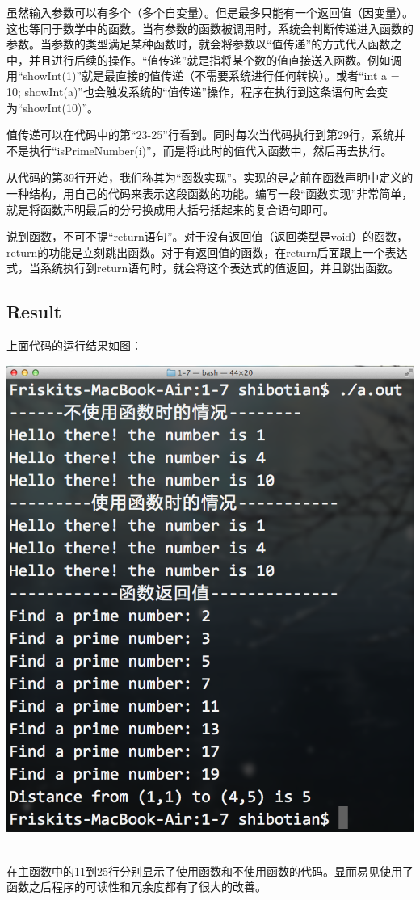 虽然输入参数可以有多个（多个自变量）。但是最多只能有一个返回值（因变量）。这也等同于数学中的函数。当有参数的函数被调用时，系统会判断传递进入函数的参数。当参数的类型满足某种函数时，就会将参数以“值传递”的方式代入函数之中，并且进行后续的操作。“值传递”就是指将某个数的值直接送入函数。例如调用“showInt(1)”就是最直接的值传递（不需要系统进行任何转换）。或者“int a = 10; showInt(a)”也会触发系统的“值传递”操作，程序在执行到这条语句时会变为“showInt(10)”。

值传递可以在代码中的第“23-25”行看到。同时每次当代码执行到第29行，系统并不是执行“isPrimeNumber(i)”，而是将i此时的值代入函数中，然后再去执行。

从代码的第39行开始，我们称其为“函数实现”。实现的是之前在函数声明中定义的一种结构，用自己的代码来表示这段函数的功能。编写一段“函数实现”非常简单，就是将函数声明最后的分号换成用大括号括起来的复合语句即可。

说到函数，不可不提“return语句”。对于没有返回值（返回类型是void）的函数，return的功能是立刻跳出函数。对于有返回值的函数，在return后面跟上一个表达式，当系统执行到return语句时，就会将这个表达式的值返回，并且跳出函数。

\subsection{Result}
上面代码的运行结果如图：
\\[\intextsep] 
  \begin{minipage}{\textwidth} 
    \centering 
    \includegraphics{codes/1-7/result.png}
    \label{fig:code-1-7-result} 
  \end{minipage}
\\[\intextsep]
在主函数中的11到25行分别显示了使用函数和不使用函数的代码。显而易见使用了函数之后程序的可读性和冗余度都有了很大的改善。

